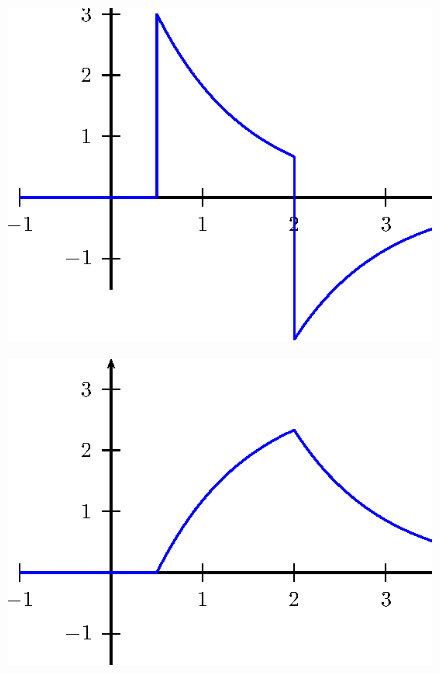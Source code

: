 \begin{figure}[!ht]
\begin{center}

\includegraphics{cap_trans_int/pics/figura_11}\end{center}
\caption{\label{fig_circ_1}}
\end{figure}
\begin{figure}[!ht]
\begin{center}

\includegraphics{cap_trans_int/pics/figura_12}\end{center}
\caption{\label{fig_circ_10}}
\end{figure}




